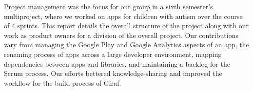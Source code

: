 Project management was the focus for our group in a sixth semester’s multiproject, where we worked on  apps for children with autism over the course of 4 sprints. This report details the overall structure of the project along with our work as product owners for a division of the overall project. Our contributions vary from managing the Google Play and Google Analytics aspects of an app, the renaming process of apps across a large developer environment, mapping dependencies between apps and libraries, and maintaining a backlog for the Scrum process. Our efforts bettered knowledge-sharing and improved the workflow for the build process of Giraf.
